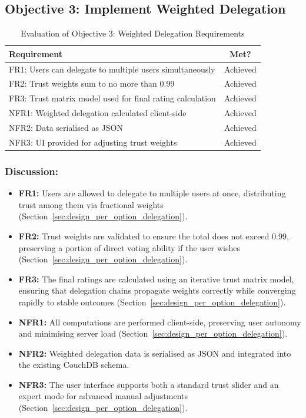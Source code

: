 \subsection{Objective 3: Implement Weighted Delegation}

\begin{table}[H]
\centering
\begin{tabular}{|p{9cm}|c|}
\hline
\textbf{Requirement} & \textbf{Met?} \\ \hline
FR1: Users can delegate to multiple users simultaneously & Achieved \\ \hline
FR2: Trust weights sum to no more than 0.99 & Achieved \\ \hline
FR3: Trust matrix model used for final rating calculation & Achieved \\ \hline
NFR1: Weighted delegation calculated client-side & Achieved \\ \hline
NFR2: Data serialised as JSON & Achieved \\ \hline
NFR3: UI provided for adjusting trust weights & Achieved \\ \hline
\end{tabular}
\caption{Evaluation of Objective 3: Weighted Delegation Requirements}
\label{tab:objective3_requirements}
\end{table}

\subsubsection{Discussion:}

\begin{itemize}
    \item \textbf{FR1:} Users are allowed to delegate to multiple users at once, distributing trust among them via fractional weights (Section~\ref{sec:design_per_option_delegation}).
    \item \textbf{FR2:} Trust weights are validated to ensure the total does not exceed 0.99, preserving a portion of direct voting ability if the user wishes (Section~\ref{sec:design_per_option_delegation}).
    \item \textbf{FR3:} The final ratings are calculated using an iterative trust matrix model, ensuring that delegation chains propagate weights correctly while converging rapidly to stable outcomes (Section~\ref{sec:design_per_option_delegation}).
    \item \textbf{NFR1:} All computations are performed client-side, preserving user autonomy and minimising server load (Section~\ref{sec:design_per_option_delegation}).
    \item \textbf{NFR2:} Weighted delegation data is serialised as JSON and integrated into the existing CouchDB schema.
    \item \textbf{NFR3:} The user interface supports both a standard trust slider and an expert mode for advanced manual adjustments (Section~\ref{sec:design_per_option_delegation}).
\end{itemize}

